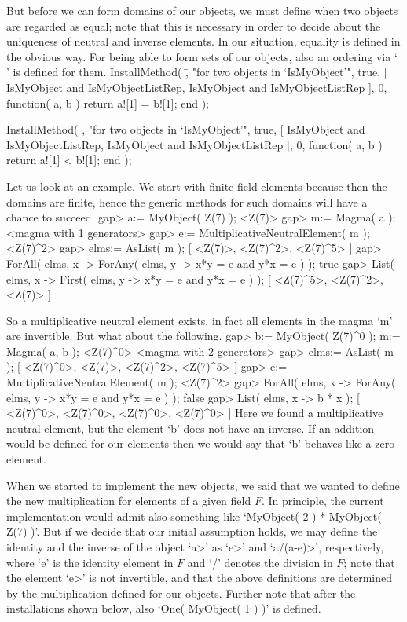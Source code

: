 But before we can form domains of our objects,
we must define when two objects are regarded as equal;
note that this is necessary in order to decide about the uniqueness
of neutral and inverse elements.
In our situation, equality is defined in the obvious way.
For being able to form sets of our objects,
also an ordering via `\\\<' is defined for them.
\begintt
InstallMethod( \=,
    "for two objects in `IsMyObject'",
    true,
    [ IsMyObject and IsMyObjectListRep,
      IsMyObject and IsMyObjectListRep ], 0,
    function( a, b )
    return a![1] = b![1];
    end );

InstallMethod( \<,
    "for two objects in `IsMyObject'",
    true,
    [ IsMyObject and IsMyObjectListRep,
      IsMyObject and IsMyObjectListRep ], 0,
    function( a, b )
    return a![1] < b![1];
    end );
\endtt

Let us look at an example.
We start with finite field elements because then the domains are finite,
hence the generic methods for such domains will have a chance to succeed.
\begintt
gap> a:= MyObject( Z(7) );
<Z(7)>
gap> m:= Magma( a );
<magma with 1 generators>
gap> e:= MultiplicativeNeutralElement( m );
<Z(7)^2>
gap> elms:= AsList( m );
[ <Z(7)>, <Z(7)^2>, <Z(7)^5> ]
gap> ForAll( elms, x -> ForAny( elms, y -> x*y = e and y*x = e ) );
true
gap> List( elms, x -> First( elms, y -> x*y = e and y*x = e ) );   
[ <Z(7)^5>, <Z(7)^2>, <Z(7)> ]
\endtt

So a multiplicative neutral element exists,
in fact all elements in the magma `m' are invertible.
But what about the following.
\begintt
gap> b:= MyObject( Z(7)^0 );  m:= Magma( a, b );
<Z(7)^0>
<magma with 2 generators>
gap> elms:= AsList( m );
[ <Z(7)^0>, <Z(7)>, <Z(7)^2>, <Z(7)^5> ]
gap> e:= MultiplicativeNeutralElement( m );
<Z(7)^2>
gap> ForAll( elms, x -> ForAny( elms, y -> x*y = e and y*x = e ) );
false
gap> List( elms, x -> b * x );
[ <Z(7)^0>, <Z(7)^0>, <Z(7)^0>, <Z(7)^0> ]
\endtt
Here we found a multiplicative neutral element,
but the element `b' does not have an inverse.
If an addition would be defined for our elements then we would say
that `b' behaves like a zero element.

When we started to implement the new objects,
we said that we wanted to define the new multiplication for elements
of a given field $F$.
In principle, the current implementation would admit also something
like `MyObject( 2 ) * MyObject( Z(7) )'.
But if we decide that our initial assumption holds,
we may define the identity and the inverse of the object `\<a>' as
`\*e>' and `\<a/(a-e)>', respectively,
where `e' is the identity element in $F$ and `/' denotes the division
in $F$; 
note that the element `\<e>' is not invertible,
and that the above definitions are determined by the multiplication
defined for our objects.
Further note that after the installations shown below,
also `One( MyObject( 1 ) )' is defined.

